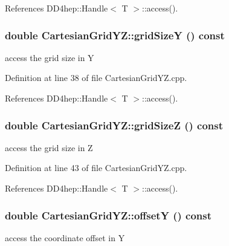 References DD4hep::Handle$<$ T $>$::access().\hypertarget{class_d_d4hep_1_1_geometry_1_1_cartesian_grid_y_z_aa682499731e5b3c658a3c0b363040eac}{
\subsubsection[{gridSizeY}]{\setlength{\rightskip}{0pt plus 5cm}double CartesianGridYZ::gridSizeY () const}}
\label{class_d_d4hep_1_1_geometry_1_1_cartesian_grid_y_z_aa682499731e5b3c658a3c0b363040eac}


access the grid size in Y 

Definition at line 38 of file CartesianGridYZ.cpp.

References DD4hep::Handle$<$ T $>$::access().\hypertarget{class_d_d4hep_1_1_geometry_1_1_cartesian_grid_y_z_a7ffe124c102475ce9c98fa0b01d330d9}{
\subsubsection[{gridSizeZ}]{\setlength{\rightskip}{0pt plus 5cm}double CartesianGridYZ::gridSizeZ () const}}
\label{class_d_d4hep_1_1_geometry_1_1_cartesian_grid_y_z_a7ffe124c102475ce9c98fa0b01d330d9}


access the grid size in Z 

Definition at line 43 of file CartesianGridYZ.cpp.

References DD4hep::Handle$<$ T $>$::access().\hypertarget{class_d_d4hep_1_1_geometry_1_1_cartesian_grid_y_z_a00b47c15cf9fd27761e2a7c3e1b4b7db}{
\subsubsection[{offsetY}]{\setlength{\rightskip}{0pt plus 5cm}double CartesianGridYZ::offsetY () const}}
\label{class_d_d4hep_1_1_geometry_1_1_cartesian_grid_y_z_a00b47c15cf9fd27761e2a7c3e1b4b7db}


access the coordinate offset in Y 

